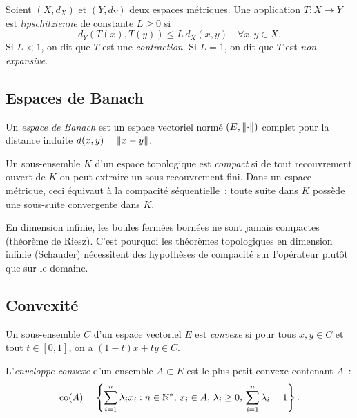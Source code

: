 \begin{definition}
Soient $(X, d_X)$ et $(Y, d_Y)$ deux espaces m\'etriques. Une application
$T : X \to Y$ est \emph{lipschitzienne} de constante $L \geq 0$ si
\[
    d_Y(T(x), T(y)) \leq L \, d_X(x, y) \quad \forall x, y \in X.
\]
Si $L < 1$, on dit que $T$ est une \emph{contraction}. Si $L = 1$, on dit
que $T$ est \emph{non expansive}.
\end{definition}

\subsection{Espaces de Banach}

\begin{definition}
Un \emph{espace de Banach} est un espace vectoriel norm\'e $(E, \left\| \cdot \right\|)$
complet pour la distance induite $d(x,y) = \left\| x - y \right\|$.
\end{definition}

\begin{definition}[Compacit\'e]
Un sous-ensemble $K$ d'un espace topologique est \emph{compact} si de tout
recouvrement ouvert de $K$ on peut extraire un sous-recouvrement fini.
Dans un espace m\'etrique, ceci \'equivaut \`a la compacit\'e s\'equentielle~:
toute suite dans $K$ poss\`ede une sous-suite convergente dans $K$.
\end{definition}

\begin{remarque}
En dimension infinie, les boules ferm\'ees born\'ees ne sont jamais compactes
(th\'eor\`eme de Riesz). C'est pourquoi les th\'eor\`emes topologiques en
dimension infinie (Schauder) n\'ecessitent des hypoth\`eses de compacit\'e sur
l'op\'erateur plut\^ot que sur le domaine.
\end{remarque}

\subsection{Convexit\'e}

\begin{definition}
Un sous-ensemble $C$ d'un espace vectoriel $E$ est \emph{convexe} si pour tous
$x, y \in C$ et tout $t \in [0,1]$, on a $(1-t)x + ty \in C$.
\end{definition}

\begin{definition}
L'\emph{enveloppe convexe} d'un ensemble $A \subset E$ est le plus petit
convexe contenant $A$~:
\[
    \mathrm{co}(A) = \left\{ \sum_{i=1}^n \lambda_i x_i : n \in \mathbb{N}^*,
    \, x_i \in A, \, \lambda_i \geq 0, \, \sum_{i=1}^n \lambda_i = 1 \right\}.
\]
\end{definition}

